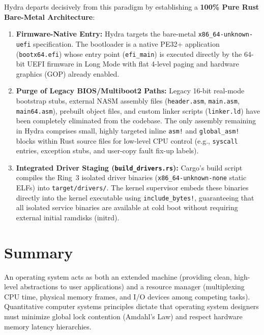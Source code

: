 Hydra departs decisively from this paradigm by establishing a \textbf{100\% Pure Rust Bare-Metal Architecture}:
\begin{enumerate}
    \item \textbf{Firmware-Native Entry:} Hydra targets the bare-metal \texttt{x86\_64-unknown-uefi} specification. The bootloader is a native PE32+ application (\texttt{bootx64.efi}) whose entry point (\texttt{efi\_main}) is executed directly by the 64-bit UEFI firmware in Long Mode with flat 4-level paging and hardware graphics (GOP) already enabled.
    \item \textbf{Purge of Legacy BIOS/Multiboot2 Paths:} Legacy 16-bit real-mode bootstrap stubs, external NASM assembly files (\texttt{header.asm}, \texttt{main.asm}, \texttt{main64.asm}), prebuilt object files, and custom linker scripts (\texttt{linker.ld}) have been completely eliminated from the codebase. The only assembly remaining in Hydra comprises small, highly targeted inline \texttt{asm!} and \texttt{global\_asm!} blocks within Rust source files for low-level CPU control (e.g., \texttt{syscall} entries, exception stubs, and user-copy fault fix-up labels).
    \item \textbf{Integrated Driver Staging (\texttt{build\_drivers.rs}):} Cargo's build script compiles the Ring~3 isolated driver binaries (\texttt{x86\_64-unknown-none} static ELFs) into \texttt{target/drivers/}. The kernel supervisor embeds these binaries directly into the kernel executable using \texttt{include\_bytes!}, guaranteeing that all isolated service binaries are available at cold boot without requiring external initial ramdisks (initrd).
\end{enumerate}

\section{Summary}
\label{sec:summary_chap1}

An operating system acts as both an extended machine (providing clean, high-level abstractions to user applications) and a resource manager (multiplexing CPU time, physical memory frames, and I/O devices among competing tasks). Quantitative computer systems principles dictate that operating system designers must minimize global lock contention (Amdahl's Law) and respect hardware memory latency hierarchies.


